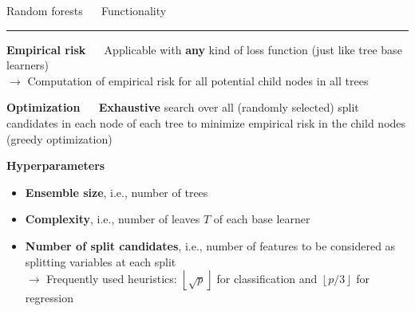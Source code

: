 \documentclass[11pt,compress,t,notes=noshow, xcolor=table]{beamer}
\begin{document}

\LARGE
\begin{frame}{\textcolor{gray!80}{Random forests} ~~ Functionality}
\normalsize
\vspace{-0.5cm}
\noindent \textcolor{gray!80}{\rule{\textwidth}{1pt}}

\vspace{0.3cm}

\footnotesize

\textbf{\textcolor{gray!80}{Empirical risk}} ~~
Applicable with \textbf{any} kind of loss function (just like tree base 
learners) \\
$\rightarrow$ Computation of empirical risk for all potential child nodes in all 
trees

\medskip

\textbf{\textcolor{gray!80}{Optimization}} ~~ \textbf{Exhaustive} search over
all (randomly selected) split candidates in each node of each tree to minimize
empirical risk in the child nodes (greedy optimization) \\

\medskip

\textbf{\textcolor{gray!80}{Hyperparameters}}

\begin{itemize}
  \item \textbf{Ensemble size}, i.e., number of trees
  \item \textbf{Complexity}, i.e., number of leaves $T$ of each base learner
  \item \textbf{Number of split candidates}, i.e., number of features to be
  considered as splitting variables at each split \\
  $\rightarrow$ Frequently used heuristics: 
  $\left \lfloor{\sqrt{p}}\right \rfloor$ for classification and
  $\left \lfloor{p/3}\right \rfloor$ for regression
\end{itemize}
  
\end{frame}


\end{document}
